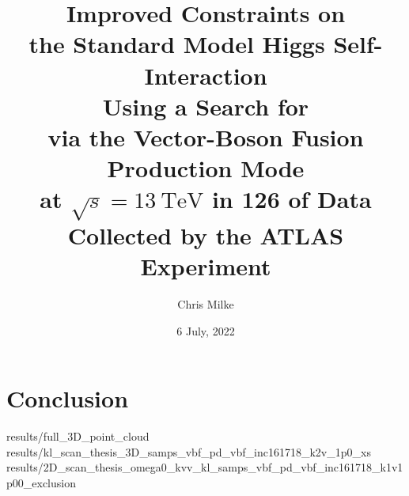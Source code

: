 \documentclass{beamer}
\begin{document}
\title{
    Improved Constraints on \\the Standard Model Higgs Self-Interaction \\
    Using a Search for \hhbbbb \\via the Vector-Boson Fusion Production Mode \\
    at $\sqrt{s}=13~\mathrm{TeV}$ in 126 \ifb of Data \\Collected by the ATLAS Experiment
}

\author{Chris Milke}
\date{6 July, 2022}

\frame{\titlepage}





\section{Conclusion}
{results/full_3D_point_cloud}
{results/kl_scan_thesis_3D_samps_vbf_pd_vbf_inc161718_k2v_1p0_xs}
{results/2D_scan_thesis_omega0_kvv_kl_samps_vbf_pd_vbf_inc161718_k1v1p00_exclusion}


%
%
%
%
\end{document}
